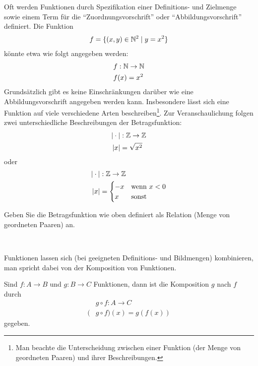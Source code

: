 \begin{rk}
    Oft werden Funktionen durch Spezifikation einer Definitions- und Zielmenge sowie einem Term für die ``Zuordnungsvorschrift'' oder ``Abbildungsvorschrift'' definiert. Die Funktion
    \begin{align*}
        f = \{(x,y)\in\mathbb{N}^2\mid y=x^2\}
    \end{align*}
    könnte etwa wie folgt angegeben werden:
    \begin{align*}
        f&:\mathbb{N}\to\mathbb{N}\\
        f&(x)=x^2
    \end{align*}
    Grundsätzlich gibt es keine Einschränkungen darüber wie eine Abbildungsvorschrift angegeben werden kann. Insbesondere lässt sich eine Funktion auf viele verschiedene Arten beschreiben\footnote{Man beachte die Unterscheidung zwischen einer Funktion (der Menge von geordneten Paaren) und ihrer Beschreibungen.}. Zur Veranschaulichung folgen zwei unterschiedliche Beschreibungen der Betragsfunktion:
    \begin{align*}
        |\cdot|&:\mathbb{Z}\to\mathbb{Z}\\
        |x| &= \sqrt{x^2}
    \end{align*}
    oder
    \begin{align*}
        |\cdot|&:\mathbb{Z}\to\mathbb{Z}\\
        |x| &= \begin{cases}
            -x&\text{wenn } x<0\\
            x&\text{sonst}
        \end{cases}
    \end{align*}
\end{rk}

\begin{ueb}
Geben Sie die Betragsfunktion wie oben definiert als Relation (Menge von geordneten Paaren) an.
\end{ueb}
\begin{lsg}
    {~\answerspace{5cm}}
\end{lsg}

Funktionen lassen sich (bei geeigneten Definitions- und Bildmengen) kombinieren, man spricht dabei von der Komposition von Funktionen.

\begin{df}
    Sind $f:A\to B$ und $g:B\to C$ Funktionen, dann ist die Komposition $g$ nach $f$ durch
    \begin{align*}
        &g\circ f:A\to C\\
        (&g\circ f)(x)=g(f(x))
    \end{align*}
    gegeben.
\end{df}

